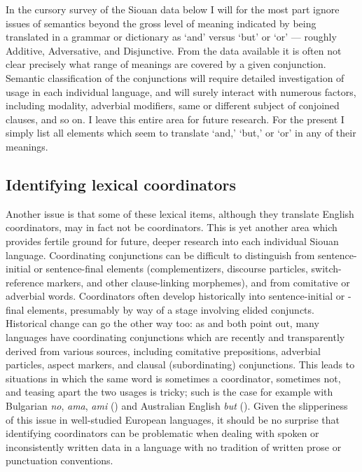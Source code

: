 \documentclass[output=paper]{LSP/langsci}
\begin{document}
In the cursory survey of the Siouan data below I will for the most part ignore issues of semantics beyond the gross level of meaning indicated by being translated in a grammar or dictionary as `and' versus `but' or `or' --- roughly Additive, Adversative, and Disjunctive. From the data available it is often not clear precisely what range of meanings are covered by a given conjunction. Semantic classification of the conjunctions will require detailed investigation of usage in each individual language, and will surely interact with numerous factors, including modality, adverbial modifiers, same or different subject of conjoined clauses, and so on. I leave this entire area for future research. For the present I simply list all elements which seem to translate `and,' `but,' or `or' in any of their meanings.

\subsection{Identifying lexical coordinators}

Another issue is that some of these lexical items, although they translate English coordinators, may in fact not be coordinators. This is yet another area which provides fertile ground for future, deeper research into each individual Siouan language. Coordinating conjunctions can be difficult to distinguish from sentence-initial or sentence-final elements (complementizers, discourse particles, switch-reference markers, and other clause-linking morphemes), and from comitative or adverbial words. Coordinators often develop historically into sentence-initial or -final elements, presumably by way of a stage involving elided conjuncts. Historical change can go the other way too: as \citet{Mithun1988} and \citet{Stassen2000} both point out, many languages have coordinating conjunctions which are recently and transparently derived from various sources, including comitative prepositions, adverbial particles, aspect markers, and clausal (subordinating) conjunctions. This leads to situations in which the same word is sometimes a coordinator, sometimes not, and teasing apart the two usages is tricky; such is the case for example with Bulgarian \textit{no}, \textit{ama}, \textit{ami} (\citealt{Fielder2008}) and Australian English \textit{but} (\citealt{MulderThompson2008}). Given the slipperiness of this issue in well-studied European languages, it should be no surprise that identifying coordinators can be problematic when dealing with spoken or inconsistently written data in a language with no tradition of written prose or punctuation conventions.
\end{document}
